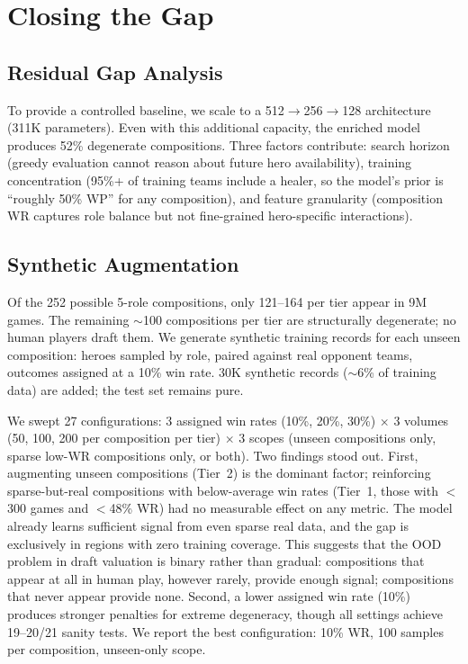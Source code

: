 \documentclass[journal]{IEEEtran}
\begin{document}
\section{Closing the Gap}

\subsection{Residual Gap Analysis}

To provide a controlled baseline, we scale to a 512$\to$256$\to$128 architecture (311K parameters). Even with this additional capacity, the enriched model produces 52\% degenerate compositions. Three factors contribute: search horizon (greedy evaluation cannot reason about future hero availability), training concentration (95\%+ of training teams include a healer, so the model's prior is ``roughly 50\% WP'' for any composition), and feature granularity (composition WR captures role balance but not fine-grained hero-specific interactions).

\subsection{Synthetic Augmentation}

Of the 252 possible 5-role compositions, only 121--164 per tier appear in 9M games. The remaining $\sim$100 compositions per tier are structurally degenerate; no human players draft them. We generate synthetic training records for each unseen composition: heroes sampled by role, paired against real opponent teams, outcomes assigned at a 10\% win rate. 30K synthetic records ($\sim$6\% of training data) are added; the test set remains pure.

We swept 27 configurations: 3 assigned win rates (10\%, 20\%, 30\%) $\times$ 3 volumes (50, 100, 200 per composition per tier) $\times$ 3 scopes (unseen compositions only, sparse low-WR compositions only, or both). Two findings stood out. First, augmenting unseen compositions (Tier~2) is the dominant factor; reinforcing sparse-but-real compositions with below-average win rates (Tier~1, those with $<$300 games and $<$48\% WR) had no measurable effect on any metric. The model already learns sufficient signal from even sparse real data, and the gap is exclusively in regions with zero training coverage. This suggests that the OOD problem in draft valuation is binary rather than gradual: compositions that appear at all in human play, however rarely, provide enough signal; compositions that never appear provide none. Second, a lower assigned win rate (10\%) produces stronger penalties for extreme degeneracy, though all settings achieve 19--20/21 sanity tests. We report the best configuration: 10\% WR, 100 samples per composition, unseen-only scope.
\end{document}
